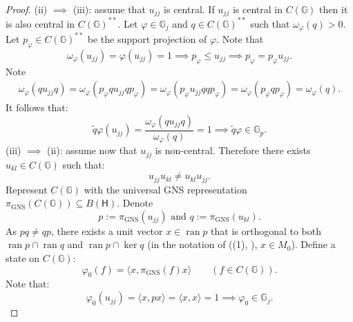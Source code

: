 \documentclass[12pt]{amsart}
\theoremstyle{remark}
\theoremstyle{remark}
\begin{document}
\begin{proof}
\bigskip

(ii) $\implies$ (iii): assume that $u_{jj}$ is central. If $u_{jj}$ is central in $C(\mathbb{G})$ then it is also central in $C(\mathbb{G})^{**}$. Let $\varphi\in\mathbb{G}_j$ and $q\in C(\mathbb{G})^{**}$ such that $\omega_\varphi(q)>0$. Let $p_\varphi\in C(\mathbb{G})^{**}$ be the support projection of $\varphi$. Note that
$$\omega_\varphi(u_{jj})=\varphi(u_{jj})=1\implies p_\varphi\leq u_{jj}\implies p_\varphi=p_\varphi u_{jj}.$$
Note
\begin{align*}
  \omega_\varphi(qu_{jj}q)  =\omega_\varphi(p_\varphi qu_{jj}q p_\varphi) =\omega_\varphi(p_\varphi u_{jj}qqp_\varphi) =\omega_\varphi(p_\varphi q p_{\varphi})=\omega_\varphi(q).
\end{align*}
It follows that:
$$\widetilde{q}\varphi(u_{jj})=\frac{\omega_\varphi(qu_{jj}q)}{\omega_\varphi(q)}=1\implies \widetilde{q}\varphi\in \mathbb{G}_p.$$
(iii) $\implies$ (ii): assume now that $u_{jj}$ is non-central. Therefore there exists $u_{kl}\in C(\mathbb{G})$ such that:
$$u_{jj}u_{kl}\neq u_{kl}u_{jj}.$$
Represent $C(\mathbb{G})$ with the universal GNS representation $\pi_{\text{GNS}}(C(\mathbb{G}))\subseteq B(\mathsf{H})$. Denote
$$p:=\pi_{\text{GNS}}(u_{jj})\text{ and }q:=\pi_{\text{GNS}}(u_{kl}).$$
As $pq\neq qp$,  there exists a unit vector $x\in \operatorname{ran} p$ that is orthogonal to both  $\operatorname{ran} p\cap \operatorname{ran} q$ and $\operatorname{ran} p\cap \ker q$ (in the notation of ((1), \cite{bos}), $x\in M_0$). Define a state on $C(\mathbb{G})$:
$$\varphi_0(f)=\langle x,\pi_{\text{GNS}}(f)x\rangle\qquad (f\in C(\mathbb{G})).$$
Note that:
$$\varphi_0(u_{jj})=\langle x,p x\rangle=\langle x,x\rangle =1\implies \varphi_0\in \mathbb{G}_j.$$



\end{proof}
\end{document}
